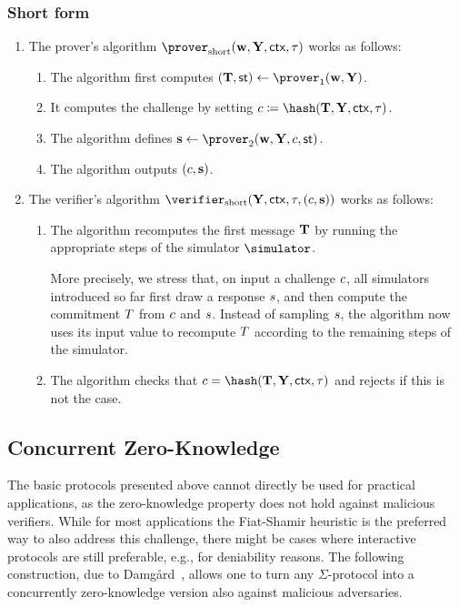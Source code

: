 \documentclass[runningheads,11pt]{article}
\begin{document}
\subsubsection{Short form}
\begin{enumerate}
  \item
    The prover's algorithm $\shortprover(\vec \witness, \vec \statement,\ctx, \stag)$ works as follows:
    \begin{enumerate}
      \item
        The algorithm first computes $(\vec \commitment,\st)\gets\prover_1(\vec \witness, \vec \statement)$.
      \item
        It computes the challenge by setting $c\defeq\hash(\vec \commitment, \vec \statement,\ctx, \stag)$.
      \item
        The algorithm defines $\vec \response\gets\prover_2(\vec \witness,\vec \statement, \challenge,\st)$.
      \item
        The algorithm outputs $(c,\mathbf {s})$.
    \end{enumerate}
  \item
    The verifier's algorithm $\shortverifier(\vec \statement, \ctx, \stag, (\challenge, \vec \response))$ works as follows:
    \begin{enumerate}
      \item\label{item:fslong:v:recomputet}
        The algorithm recomputes the first message $\mathbf {T}$ by running the appropriate steps of the simulator $\simulator$.

         More precisely, we stress that, on input a challenge $c$, all simulators introduced so far first draw a response $s$, and then compute the commitment $T$ from $c$ and $s$.
        Instead of sampling $s$, the algorithm now uses its input value to recompute $T$ according to the remaining steps of the simulator.
        \item
        The algorithm checks that $c=\hash(\vec \commitment, \vec \statement, \ctx, \tau)$ and rejects if this is not the case.
    \end{enumerate}
\end{enumerate}




\subsection{Concurrent Zero-Knowledge}\label{sec:concurrent}
The basic protocols presented above cannot directly be used for practical applications, as the zero-knowledge property does not hold against malicious verifiers.
While for most applications the Fiat-Shamir heuristic is the preferred way to also address this challenge, there might be cases where interactive protocols are still preferable, e.g., for deniability reasons.
The following construction, due to Damg\r{a}rd~\cite{EC:Damgard00}, allows one to turn any $\Sigma$-protocol into a concurrently zero-knowledge version also against malicious adversaries.
\end{document}
